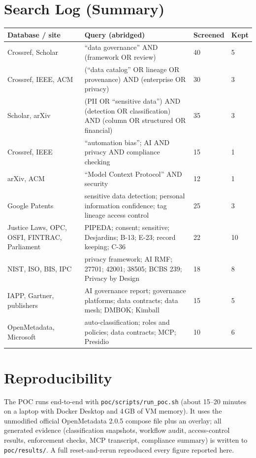 \documentclass[journal,onecolumn,11pt]{IEEEtran}
\begin{document}
\section{Search Log (Summary)}
\label{app:search}
{\footnotesize
\begin{tabularx}{\linewidth}{L{2.6cm} Y L{1.3cm} L{1.0cm}}
\toprule
\textbf{Database / site} & \textbf{Query (abridged)} & \textbf{Screened} & \textbf{Kept} \\
\midrule
Crossref, Scholar & ``data governance'' AND (framework OR review) & 40 & 5 \\
Crossref, IEEE, ACM & (``data catalog'' OR lineage OR provenance) AND (enterprise OR privacy) & 30 & 3 \\
Scholar, arXiv & (PII OR ``sensitive data'') AND (detection OR classification) AND (column OR structured OR financial) & 35 & 3 \\
Crossref, IEEE & ``automation bias''; AI AND privacy AND compliance checking & 15 & 1 \\
arXiv, ACM & ``Model Context Protocol'' AND security & 12 & 1 \\
Google Patents & sensitive data detection; personal information confidence; tag lineage access control & 25 & 3 \\
Justice Laws, OPC, OSFI, FINTRAC, Parliament & PIPEDA; consent; sensitive; Desjardins; B-13; E-23; record keeping; C-36 & 22 & 10 \\
NIST, ISO, BIS, IPC & privacy framework; AI RMF; 27701; 42001; 38505; BCBS 239; Privacy by Design & 18 & 8 \\
IAPP, Gartner, publishers & AI governance report; governance platforms; data contracts; data mesh; DMBOK; Kimball & 15 & 5 \\
OpenMetadata, Microsoft & auto-classification; roles and policies; data contracts; MCP; Presidio & 10 & 6 \\
\bottomrule
\end{tabularx}
}

\section{Reproducibility}
\label{app:repro}
The POC runs end-to-end with \texttt{poc/scripts/run\_poc.sh} (about 15--20 minutes on a laptop with Docker Desktop and 4\,GB of VM memory). It uses the unmodified official OpenMetadata 2.0.5 compose file plus an overlay; all generated evidence (classification snapshots, workflow audit, access-control results, enforcement checks, MCP transcript, compliance summary) is written to \texttt{poc/results/}. A full reset-and-rerun reproduced every figure reported here.
\end{document}

